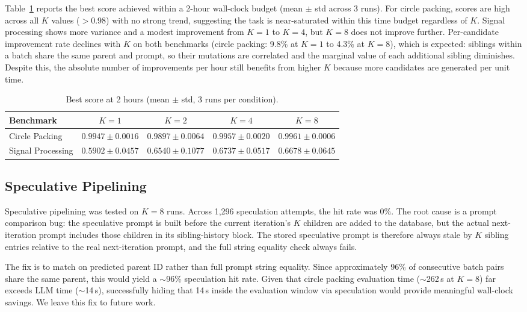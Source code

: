\documentclass{article}
\begin{document}
Table~\ref{tab:best_score} reports the best score achieved within a
2-hour wall-clock budget (mean $\pm$ std across 3 runs). For circle
packing, scores are high across all $K$ values ($>$0.98) with no strong
trend, suggesting the task is near-saturated within this time budget
regardless of $K$. Signal processing shows more variance and a modest
improvement from $K{=}1$ to $K{=}4$, but $K{=}8$ does not improve
further. Per-candidate improvement rate declines with $K$ on both
benchmarks (circle packing: 9.8\% at $K{=}1$ to 4.3\% at $K{=}8$),
which is expected: siblings within a batch share the same parent and
prompt, so their mutations are correlated and the marginal value of each
additional sibling diminishes. Despite this, the absolute number of
improvements per hour still benefits from higher $K$ because more
candidates are generated per unit time.

\begin{table}[ht]
\centering
\small
\caption{Best score at 2 hours (mean $\pm$ std, 3 runs per condition).}
\label{tab:best_score}
\begin{tabular}{lcccc}
\toprule
Benchmark & $K{=}1$ & $K{=}2$ & $K{=}4$ & $K{=}8$ \\
\midrule
Circle Packing    & $0.9947 \pm 0.0016$ & $0.9897 \pm 0.0064$
                  & $0.9957 \pm 0.0020$ & $0.9961 \pm 0.0006$ \\
Signal Processing & $0.5902 \pm 0.0457$ & $0.6540 \pm 0.1077$
                  & $0.6737 \pm 0.0517$ & $0.6678 \pm 0.0645$ \\
\bottomrule
\end{tabular}
\end{table}

\subsection{Speculative Pipelining}
\label{sec:results-spec}

Speculative pipelining was tested on $K{=}8$ runs. Across 1,296
speculation attempts, the hit rate was 0\%. The root cause is a prompt
comparison bug: the speculative prompt is built before the current
iteration's $K$ children are added to the database, but the actual
next-iteration prompt includes those children in its sibling-history
block. The stored speculative prompt is therefore always stale by $K$
sibling entries relative to the real next-iteration prompt, and the
full string equality check always fails.

The fix is to match on predicted parent ID rather than full prompt
string equality. Since approximately 96\% of consecutive batch pairs
share the same parent, this would yield a $\sim$96\% speculation hit
rate. Given that circle packing evaluation time ($\sim$262\,s at
$K{=}8$) far exceeds LLM time ($\sim$14\,s), successfully hiding that
14\,s inside the evaluation window via speculation would provide
meaningful wall-clock savings. We leave this fix to future work.
\end{document}
